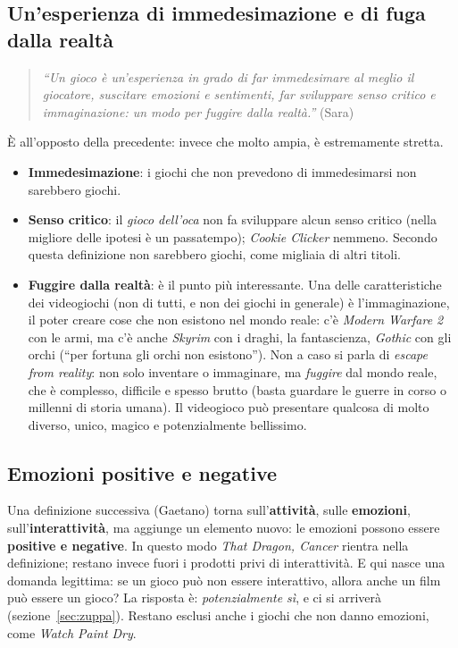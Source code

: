 \subsection{Un'esperienza di immedesimazione e di fuga dalla realtà}

\begin{quote}
\emph{``Un gioco è un'esperienza in grado di far immedesimare al meglio il
giocatore, suscitare emozioni e sentimenti, far sviluppare senso critico e
immaginazione: un modo per fuggire dalla realtà.''} (Sara)
\end{quote}

È all'opposto della precedente: invece che molto ampia, è estremamente
stretta.
\begin{itemize}
  \item \textbf{Immedesimazione}: i giochi che non prevedono di immedesimarsi
        non sarebbero giochi.
  \item \textbf{Senso critico}: il \emph{gioco dell'oca} non fa sviluppare
        alcun senso critico (nella migliore delle ipotesi è un passatempo);
        \emph{Cookie Clicker} nemmeno. Secondo questa definizione non sarebbero
        giochi, come migliaia di altri titoli.
  \item \textbf{Fuggire dalla realtà}: è il punto più interessante. Una delle
        caratteristiche dei videogiochi (non di tutti, e non dei giochi in
        generale) è l'immaginazione, il poter creare cose che non esistono nel
        mondo reale: c'è \emph{Modern Warfare 2} con le armi, ma c'è anche
        \emph{Skyrim} con i draghi, la fantascienza, \emph{Gothic} con gli
        orchi (``per fortuna gli orchi non esistono''). Non a caso si parla di
        \emph{escape from reality}: non solo inventare o immaginare, ma
        \emph{fuggire} dal mondo reale, che è complesso, difficile e spesso
        brutto (basta guardare le guerre in corso o millenni di storia umana).
        Il videogioco può presentare qualcosa di molto diverso, unico, magico e
        potenzialmente bellissimo.
\end{itemize}

\subsection{Emozioni positive e negative}

Una definizione successiva (Gaetano) torna sull'\textbf{attività}, sulle
\textbf{emozioni}, sull'\textbf{interattività}, ma aggiunge un elemento nuovo:
le emozioni possono essere \textbf{positive e negative}. In questo modo
\emph{That Dragon, Cancer} rientra nella definizione; restano invece fuori i
prodotti privi di interattività. E qui nasce una domanda legittima: se un
gioco può non essere interattivo, allora anche un film può essere un gioco? La
risposta è: \emph{potenzialmente sì}, e ci si arriverà (sezione~\ref{sec:zuppa}).
Restano esclusi anche i giochi che non danno emozioni, come \emph{Watch Paint
Dry}.

